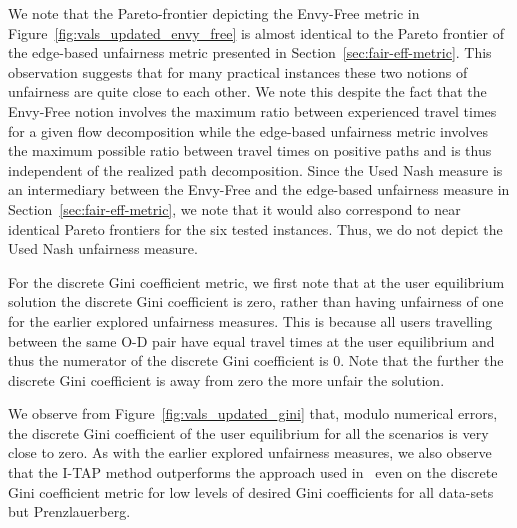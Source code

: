\documentclass{article}
\begin{document}
We note that the Pareto-frontier depicting the Envy-Free metric in Figure~\ref{fig:vals_updated_envy_free} is almost identical to the Pareto frontier of the edge-based unfairness metric presented in Section~\ref{sec:fair-eff-metric}. This observation suggests that for many practical instances these two notions of unfairness are quite close to each other. We note this despite the fact that the Envy-Free notion involves the maximum ratio between experienced travel times for a given flow decomposition while the edge-based unfairness metric involves the maximum possible ratio between travel times on positive paths and is thus independent of the realized path decomposition. Since the Used Nash measure is an intermediary between the Envy-Free and the edge-based unfairness measure in Section~\ref{sec:fair-eff-metric}, we note that it would also correspond to near identical Pareto frontiers for the six tested instances. Thus, we do not depict the Used Nash unfairness measure.


For the discrete Gini coefficient metric, we first note that at the user equilibrium solution the discrete Gini coefficient is zero, rather than having unfairness of one for the earlier explored unfairness measures. This is because all users travelling between the same O-D pair have equal travel times at the user equilibrium and thus the numerator of the discrete Gini coefficient is 0. Note that the further the discrete Gini coefficient is away from zero the more unfair the solution.

We observe from Figure~\ref{fig:vals_updated_gini} that, modulo numerical errors, the discrete Gini coefficient of the user equilibrium for all the scenarios is very close to zero. As with the earlier explored unfairness measures, we also observe that the I-TAP method outperforms the approach used in~\citet{so-routing-seminal} even on the discrete Gini coefficient metric for low levels of desired Gini coefficients for all data-sets but Prenzlauerberg. 
\end{document}
